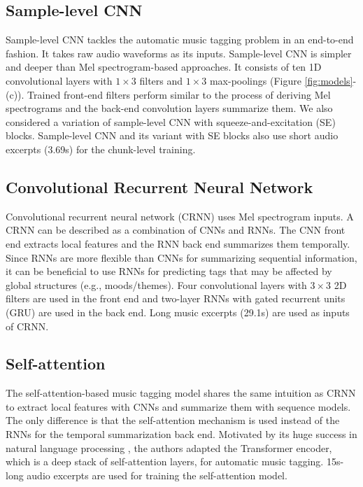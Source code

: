 \documentclass{article}
\begin{document}
\subsection{Sample-level CNN}
Sample-level CNN \cite{lee2017sample} tackles the automatic music tagging problem in an end-to-end fashion. It takes raw audio waveforms as its inputs. Sample-level CNN is simpler and deeper than Mel spectrogram-based approaches. It consists of ten 1D convolutional layers with $1 \times 3$ filters and $1 \times 3$ max-poolings (Figure \ref{fig:models}-(c)). Trained front-end filters perform similar to the process of deriving Mel spectrograms and the back-end convolution layers summarize them. 
We also considered a variation of sample-level CNN \cite{kim2018sample} with squeeze-and-excitation (SE) \cite{hu2018squeeze} blocks. Sample-level CNN and its variant with SE blocks also use short audio excerpts (3.69s) for the chunk-level training.



\subsection{Convolutional Recurrent Neural Network}
Convolutional recurrent neural network (CRNN) \cite{choi2017convolutional} uses Mel spectrogram inputs. A CRNN can be described as a combination of CNNs and RNNs. The CNN front end extracts local features and the RNN back end summarizes them temporally. Since RNNs are more flexible than CNNs for summarizing sequential information, it can be beneficial to use RNNs for predicting tags that may be affected by global structures (e.g., moods/themes). Four convolutional layers with $3 \times 3$ 2D filters are used in the front end and two-layer RNNs with gated recurrent units (GRU) are used in the back end. Long music excerpts (29.1s) are used as inputs of CRNN.


\subsection{Self-attention}
The self-attention-based music tagging model \cite{won2019toward} shares the same intuition as CRNN to extract local features with CNNs and summarize them with sequence models. The only difference is that the self-attention mechanism is used instead of the RNNs for the temporal summarization back end. Motivated by its huge success in natural language processing \cite{devlin2018bert}, the authors adapted the Transformer encoder, which is a deep stack of self-attention layers, for automatic music tagging. 15s-long audio excerpts are used for training the self-attention model.
\end{document}

